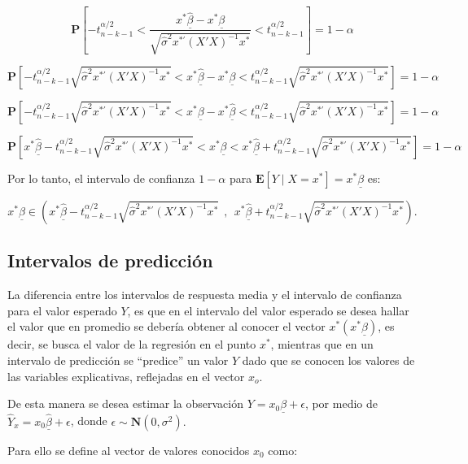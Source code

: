\documentclass[a4paper,oneside,openany]{book}
\begin{document}
\[\mathbf{P}\left[ -t^{\alpha/2}_{n-k-1}<\frac{x^*\underline{\hat{\beta}}-x^*\underline{\beta}}{\sqrt{\hat{\sigma}^2 x^{*'}(X'X)^{-1}x^*}}  <t^{\alpha/2}_{n-k-1}\right]=1-\alpha\]

\[\mathbf{P}\left[ -t^{\alpha/2}_{n-k-1}\sqrt{\hat{\sigma}^2 x^{*'}(X'X)^{-1}x^*}<x^*\underline{\hat{\beta}}-x^*\underline{\beta}  <t^{\alpha/2}_{n-k-1}\sqrt{\hat{\sigma}^2 x^{*'}(X'X)^{-1}x^*}\right]=1-\alpha\]

\[\mathbf{P}\left[ -t^{\alpha/2}_{n-k-1}\sqrt{\hat{\sigma}^2 x^{*'}(X'X)^{-1}x^*}<x^*\underline{\beta}-x^*\underline{\hat{\beta}}  <t^{\alpha/2}_{n-k-1}\sqrt{\hat{\sigma}^2 x^{*'}(X'X)^{-1}x^*}\right]=1-\alpha\]

\[\mathbf{P}\left[ x^*\underline{\hat{\beta}}-t^{\alpha/2}_{n-k-1}\sqrt{\hat{\sigma}^2 x^{*'}(X'X)^{-1}x^*}<x^*\underline{\beta}  <x^*\underline{\hat{\beta}}+t^{\alpha/2}_{n-k-1}\sqrt{\hat{\sigma}^2 x^{*'}(X'X)^{-1}x^*}\right]=1-\alpha\]

Por lo tanto, el intervalo de confianza \(1-\alpha\) para
\(\mathbf{E}[Y \mid X=x^*]=x^*\underline{\beta}\) es:

\[x^*\underline{\beta} \in \left(x^*\underline{\hat{\beta}}-t^{\alpha/2}_{n-k-1}\sqrt{\hat{\sigma}^2 x^{*'}(X'X)^{-1}x^*} \ \ , \ \ x^*\underline{\hat{\beta}}+t^{\alpha/2}_{n-k-1}\sqrt{\hat{\sigma}^2 x^{*'}(X'X)^{-1}x^*}\right).\]

\subsection{Intervalos de predicción}\label{intervalos-de-predicciuxf3n}

La diferencia entre los intervalos de respuesta media y el intervalo de
confianza para el valor esperado \(Y\), es que en el intervalo del valor
esperado se desea hallar el valor que en promedio se debería obtener al
conocer el vector \(x^*(x^*\underline{\beta})\), es decir, se busca el
valor de la regresión en el punto \(x^*\), mientras que en un intervalo
de predicción se ``predice'' un valor \(Y\) dado que se conocen los
valores de las variables explicativas, reflejadas en el vector
\(x_{o}\).

De esta manera se desea estimar la observación
\(Y=x_{0}\underline{\beta}+\epsilon\), por medio de
\(\hat{Y}_{x}=x_{0}\underline{\hat{\beta}}+\epsilon\), donde
\(\epsilon \sim \mathbf{N} (0, \sigma^2).\)

Para ello se define al vector de valores conocidos \(x_{0}\) como:
\end{document}
